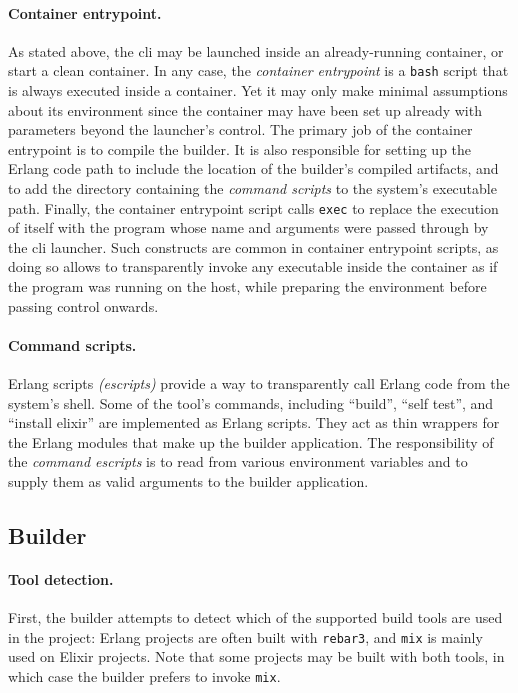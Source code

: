 \paragraph{Container entrypoint.} As stated above, the \acrshort{cli} may be launched inside an already-running container, or start a clean container. In any case, the \emph{container entrypoint} is a \lstinline|bash| script that is always executed inside a container. Yet it may only make minimal assumptions about its environment since the container may have been set up already with parameters beyond the launcher's control. The primary job of the container entrypoint is to compile the builder. It is also responsible for setting up the Erlang code path to include the location of the builder's compiled artifacts, and to add the directory containing the \emph{command scripts} to the system's executable path. Finally, the container entrypoint script calls \lstinline|exec| to replace the execution of itself with the program whose name and arguments were passed through by the \acrshort{cli} launcher. Such constructs are common in container entrypoint scripts, as doing so allows to transparently invoke any executable inside the container as if the program was running on the host, while preparing the environment before passing control onwards.

\paragraph{Command scripts.} Erlang scripts \emph{(escripts)} provide a way to transparently call Erlang code from the system's shell. Some of the tool's commands, including ``build'', ``self test'', and ``install elixir'' are implemented as Erlang scripts. They act as thin wrappers for the Erlang modules that make up the builder application. The responsibility of the \emph{command escripts} is to read from various environment variables and to supply them as valid arguments to the builder application.

\cleardoublepage
\subsection{Builder}

\paragraph{Tool detection.} First, the builder attempts to detect which of the supported build tools are used in the project: Erlang projects are often built with \lstinline|rebar3|, and \lstinline|mix| is mainly used on Elixir projects. Note that some projects may be built with both tools, in which case the builder prefers to invoke \lstinline|mix|.

